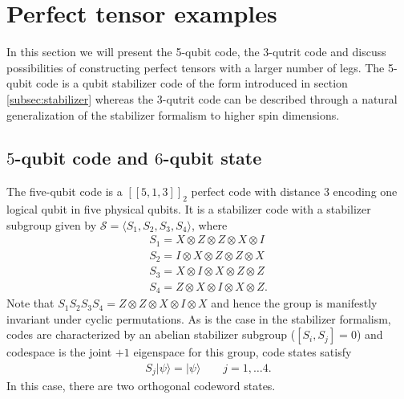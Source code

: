 \documentclass[12pt]{article}
\theoremstyle{plain}
\theoremstyle{plain}
\theoremstyle{plain}
\theoremstyle{plain}
\theoremstyle{result}
\theoremstyle{remark}
\theoremstyle{conjecture}
\theoremstyle{observation}
\theoremstyle{definition}
\theoremstyle{corollary}
\theoremstyle{definition}
\theoremstyle{definition}
\theoremstyle{assumption}
\theoremstyle{definition}
\theoremstyle{problem}
\theoremstyle{fact}
\newcommand*{\cS}{\mathcal{S}}
\begin{document}
\appendix

\section{Perfect tensor examples}\label{App:PerfectTensorExamples}

In this section we will present the 5-qubit code, the 3-qutrit code and discuss possibilities of constructing  perfect tensors with a larger number of legs.
The 5-qubit code is a qubit stabilizer code of the form introduced in section \ref{subsec:stabilizer} whereas
the 3-qutrit code can be described through a natural generalization of the stabilizer formalism to higher spin dimensions.

\subsection{$5$-qubit code and $6$-qubit state}\label{sec:5qubit}

The five-qubit code is a $[[5,1,3]]_2$ perfect code with distance 3 encoding one logical qubit in five physical qubits.
It is a stabilizer code with a stabilizer subgroup given by $\cS =\langle S_1,S_2,S_3,S_4 \rangle$, where
\begin{equation}\label{eq:5qubitStabilizers}
\begin{split}
S_{1}=X\otimes Z\otimes Z \otimes X \otimes  I \\
S_{2}=I\otimes X\otimes Z \otimes Z \otimes  X \\
S_{3}=X\otimes I\otimes X \otimes Z \otimes  Z \\
S_{4}=Z\otimes X\otimes I \otimes X \otimes  Z .
\end{split}
\end{equation}
Note that $S_1S_2S_3S_4 = Z\otimes Z \otimes X \otimes I\otimes X$ and hence the group is manifestly invariant under cyclic permutations.
As is the case in the stabilizer formalism, codes are characterized by an abelian stabilizer subgroup ($[S_{i},S_{j}]=0$) and codespace is the joint $+1$ eigenspace for this group, code states satisfy
\begin{align}
S_{j}|\psi\rangle = |\psi\rangle\qquad j=1,\ldots 4.
\end{align}
In this case, there are two orthogonal codeword states.
\end{document}
